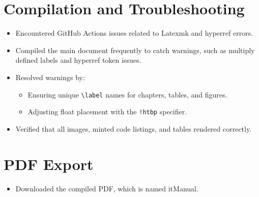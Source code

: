 \section{Compilation and Troubleshooting}

\begin{itemize}
    \item Encountered GitHub Actions issues related to Latexmk and hyperref errors.
    \item Compiled the main document frequently to catch warnings, such as multiply defined labels and hyperref token issues.
    \item Resolved warnings by: \begin{itemize}
        \item Ensuring unique \texttt{\textbackslash label} names for chapters, tables, and figures.
        \item Adjusting float placement with the \texttt{!htbp} specifier.
    \end{itemize}
    \item Verified that all images, minted code listings, and tables rendered correctly.
\end{itemize}

\section{PDF Export}

\begin{itemize}
    \item Downloaded the compiled PDF, which is named itManual.
\end{itemize}
